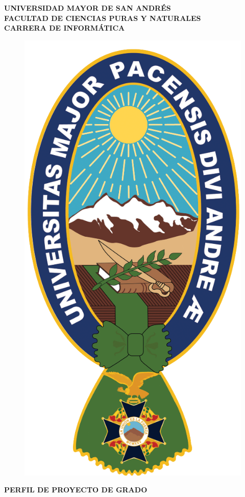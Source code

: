\begin{titlepage}
  \begin{center}
    {\textbf{UNIVERSIDAD MAYOR DE SAN ANDRÉS}}\\
    {\textbf{FACULTAD DE CIENCIAS PURAS Y NATURALES}}\\
    {\textbf{CARRERA DE INFORMÁTICA}}\\
    \vspace{2mm}
    \begin{figure}[h]
      \centering
      \includegraphics[scale=1.2]{img/Logo_UMSA.png}
    \end{figure}
    {\textbf{PERFIL DE PROYECTO DE GRADO}}\\
    

\end{center}
\end{titlepage}
